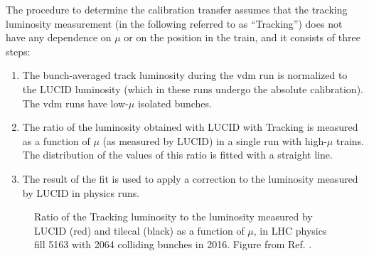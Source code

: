 The procedure to determine the calibration transfer assumes that the tracking luminosity measurement 
(in the following referred to as ``Tracking'') 
does not have any dependence on $\mu$ or on the position in the train, and it consists of three steps:
\begin{enumerate}
\item The bunch-averaged track luminosity during the \gls{vdm} run is normalized to the LUCID luminosity (which in these runs 
undergo the absolute calibration). The \gls{vdm} runs have low-$\mu$ isolated bunches.
\item The ratio of the luminosity obtained with LUCID with Tracking is measured as a function of $\mu$ (as measured by LUCID) 
in a single run with high-$\mu$ trains. The distribution of the values of this ratio is fitted with a straight line.
\item The result of the fit is used to apply a correction to the luminosity measured by LUCID in physics runs. 
\end{enumerate}

\begin{figure}[ht]
\centering
{}
\caption{Ratio of the Tracking luminosity to the luminosity measured by LUCID (red) and \gls{tilecal} (black) as a function of $\mu$, 
in LHC physics fill 5163 with 2064 colliding bunches in 2016. Figure from Ref. \cite{ATLAS-CONF-2019-021}. }
\label{fig:apppmt:calib_transfer}
\end{figure}

